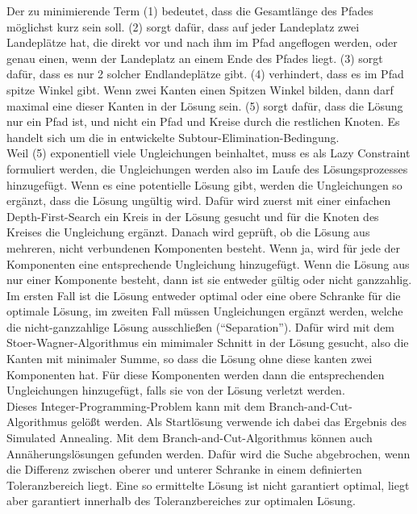 \documentclass[a4paper,10pt,ngerman]{scrartcl}
\begin{document}
Der zu minimierende Term (1) bedeutet, dass die Gesamtlänge des Pfades möglichst kurz sein soll. (2) sorgt dafür, dass auf jeder Landeplatz
zwei Landeplätze hat, die direkt vor und nach ihm im Pfad angeflogen werden, oder genau einen, wenn der Landeplatz an einem Ende des Pfades liegt.
(3) sorgt dafür, dass es nur 2 solcher Endlandeplätze gibt. (4) verhindert, dass es im Pfad spitze Winkel gibt. Wenn zwei Kanten einen Spitzen
Winkel bilden, dann darf maximal eine dieser Kanten in der Lösung sein. (5) sorgt dafür, dass die Lösung nur ein Pfad ist, und nicht ein Pfad und
Kreise durch die restlichen Knoten. Es handelt sich um die in \cite{dantzig_1954} entwickelte Subtour-Elimination-Bedingung.\\
Weil (5) exponentiell viele Ungleichungen beinhaltet, muss es als Lazy Constraint formuliert werden, die Ungleichungen werden also im Laufe des Lösungsprozesses
hinzugefügt. Wenn es
eine potentielle Lösung gibt, werden die Ungleichungen so ergänzt, dass die Lösung ungültig wird. Dafür wird zuerst mit einer einfachen Depth-First-Search ein Kreis
in der Lösung gesucht und für die Knoten des Kreises die Ungleichung ergänzt. Danach wird geprüft, ob die Lösung aus mehreren, nicht verbundenen Komponenten besteht. Wenn ja, wird für
jede der Komponenten eine entsprechende Ungleichung hinzugefügt. Wenn die Lösung aus nur einer Komponente besteht, dann ist sie entweder gültig oder nicht ganzzahlig. Im ersten Fall
ist die Lösung entweder optimal oder eine obere Schranke für die optimale Lösung, im zweiten Fall müssen Ungleichungen ergänzt werden, welche die nicht-ganzzahlige Lösung
ausschließen (``Separation''). Dafür wird mit dem Stoer-Wagner-Algorithmus\cite{stoer_1997} ein mimimaler Schnitt in der Lösung gesucht,
also die Kanten mit minimaler Summe, so dass die Lösung ohne
diese kanten zwei Komponenten hat. Für diese Komponenten werden dann die entsprechenden Ungleichungen hinzugefügt, falls sie von der Lösung verletzt werden. \\
Dieses Integer-Programming-Problem kann mit dem Branch-and-Cut-Algorithmus\cite{padberg_1991} gelößt werden. Als Startlösung verwende ich dabei das Ergebnis des Simulated Annealing.
Mit dem Branch-and-Cut-Algorithmus können auch Annäherungslösungen gefunden werden. Dafür wird die Suche abgebrochen, wenn die Differenz zwischen oberer und unterer Schranke
in einem definierten Toleranzbereich liegt. Eine so ermittelte Lösung ist nicht garantiert optimal, liegt aber garantiert innerhalb des Toleranzbereiches zur optimalen Lösung.
\end{document}
